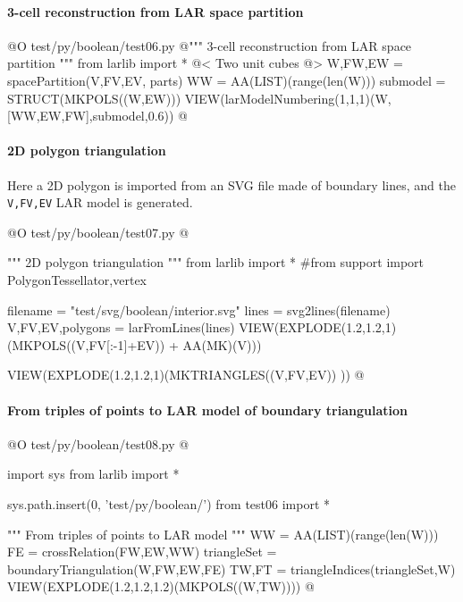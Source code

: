 \documentclass[11pt,oneside]{article}    %
\begin{document}
\paragraph{3-cell reconstruction from LAR space partition}
@O test/py/boolean/test06.py
@{""" 3-cell reconstruction from LAR space partition """
from larlib import *
@< Two unit cubes @>
W,FW,EW = spacePartition(V,FV,EV, parts)
WW = AA(LIST)(range(len(W)))
submodel = STRUCT(MKPOLS((W,EW)))
VIEW(larModelNumbering(1,1,1)(W,[WW,EW,FW],submodel,0.6))
@}



\paragraph{2D polygon triangulation}
Here a 2D polygon is imported from an SVG file made of boundary lines, and the \texttt{V,FV,EV}
LAR model is generated. 

@O test/py/boolean/test07.py
@{""" 2D polygon triangulation """
from larlib import *
#from support import PolygonTessellator,vertex

filename = "test/svg/boolean/interior.svg"
lines = svg2lines(filename)    
V,FV,EV,polygons = larFromLines(lines)
VIEW(EXPLODE(1.2,1.2,1)(MKPOLS((V,FV[:-1]+EV)) + AA(MK)(V)))

VIEW(EXPLODE(1.2,1.2,1)(MKTRIANGLES((V,FV,EV)) ))
@}


\paragraph{From triples of points to LAR model of boundary triangulation}
    
@O test/py/boolean/test08.py @{
import sys
from larlib import *

sys.path.insert(0, 'test/py/boolean/')
from test06 import *

""" From triples of points to LAR model """
WW = AA(LIST)(range(len(W)))
FE = crossRelation(FW,EW,WW)
triangleSet = boundaryTriangulation(W,FW,EW,FE)
TW,FT = triangleIndices(triangleSet,W)
VIEW(EXPLODE(1.2,1.2,1.2)(MKPOLS((W,TW))))
@}
\end{document}
